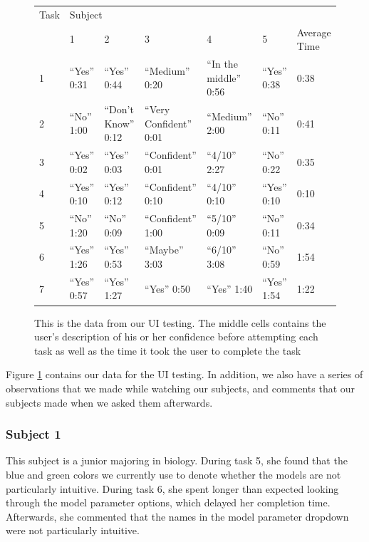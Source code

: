 \documentclass[letterpaper,10pt, onecolumn, draftclsnofoot]{IEEEtran}
\begin{document}
\begin{figure}
\begin{tabularx}{\textwidth}{|X|X|X|X|X|X|X|}
\hline
Task & \multicolumn{6}{X|}{Subject} \\
\cline{2-7}
& 1 & 2 & 3 & 4 & 5 & Average Time \\
\hline
1    & ``Yes'' 0:31 & ``Yes'' 0:44        & ``Medium'' 0:20         & ``In the middle'' 0:56 & ``Yes'' 0:38 & 0:38 \\
\hline
2    & ``No'' 1:00  & ``Don't Know'' 0:12 & ``Very Confident'' 0:01 & ``Medium'' 2:00        & ``No'' 0:11  & 0:41 \\
\hline
3    & ``Yes'' 0:02 & ``Yes'' 0:03        & ``Confident'' 0:01      & ``4/10'' 2:27          & ``No'' 0:22  & 0:35 \\
\hline
4    & ``Yes'' 0:10 & ``Yes'' 0:12        & ``Confident'' 0:10      & ``4/10'' 0:10          & ``Yes'' 0:10 & 0:10 \\
\hline
5    & ``No'' 1:20  & ``No'' 0:09         & ``Confident'' 1:00      & ``5/10'' 0:09          & ``No'' 0:11  & 0:34 \\
\hline
6    & ``Yes'' 1:26 & ``Yes'' 0:53        & ``Maybe'' 3:03          & ``6/10'' 3:08          & ``No'' 0:59  & 1:54 \\
\hline
7    & ``Yes'' 0:57 & ``Yes'' 1:27        & ``Yes'' 0:50            & ``Yes'' 1:40           & ``Yes'' 1:54 & 1:22 \\
\hline

\end{tabularx}
\caption{This is the data from our UI testing. The middle cells contains the user's description of his or her confidence before attempting each task as well as the time it took the user to complete the task}
\label{fig:uiTestData1}
\end{figure}

Figure \ref{fig:uiTestData1} contains our data for the UI testing. In addition, we also have a series of observations that we made while watching our subjects, and comments that our subjects made when we asked them afterwards.

\subsubsection{Subject 1}
This subject is a junior majoring in biology. During task 5, she found that the blue and green colors we currently use to denote whether the models are not particularly intuitive. During task 6, she spent longer than expected looking through the model parameter options, which delayed her completion time. Afterwards, she commented that the names in the model parameter dropdown were not particularly intuitive.
\end{document}
